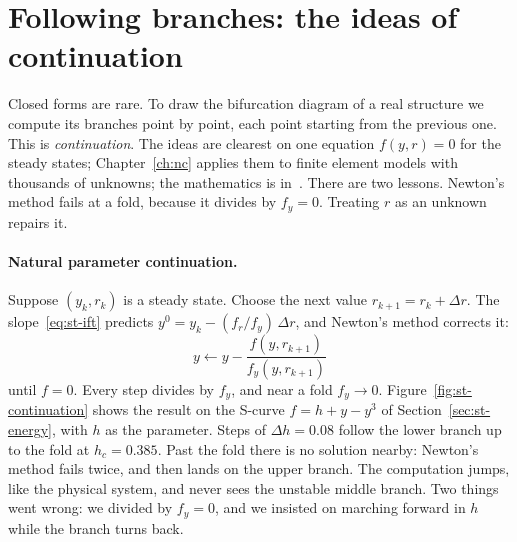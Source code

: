 \section{Following branches: the ideas of continuation}\label{sec:st-continuation}
%

Closed forms are rare. To draw the bifurcation diagram of a real structure we
compute its branches point by point, each point starting from the previous one.
This is \emph{continuation}. The ideas are clearest on one equation $f(y,r) = 0$
for the steady states; Chapter~\ref{ch:nc} applies them to finite element models
with thousands of unknowns; the mathematics is in~\cite{st-allgower2003}.
There are two lessons. Newton's method fails at a fold,
because it divides by $f_y = 0$. Treating $r$ as an unknown repairs it.

\paragraph{Natural parameter continuation.}
%
Suppose $(y_k,r_k)$ is a steady state. Choose the next value $r_{k+1} = r_k + \Delta r$.
The slope~\eqref{eq:st-ift} predicts $y^0 = y_k - (f_r/f_y)\,\Delta r$, and Newton's
method corrects it:
\begin{equation}\label{eq:st-newton}
  y \leftarrow y - \frac{f(y,r_{k+1})}{f_y(y,r_{k+1})}
\end{equation}
until $f = 0$. Every step divides by $f_y$, and near a fold $f_y \to 0$.
Figure~\ref{fig:st-continuation} shows the result on the S-curve
$f = h + y - y^3$ of Section~\ref{sec:st-energy}, with $h$ as the parameter. Steps
of $\Delta h = 0.08$ follow the lower branch up to the fold at $h_c = 0.385$. Past
the fold there is no solution nearby: Newton's method fails twice, and then lands
on the upper branch. The computation jumps, like the physical system, and never
sees the unstable middle branch. Two things went wrong: we divided by $f_y = 0$,
and we insisted on marching forward in $h$ while the branch turns back.

